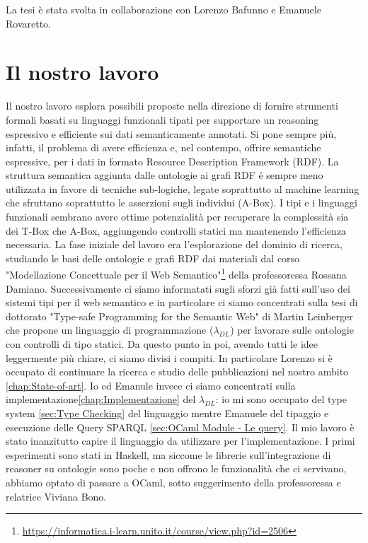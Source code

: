 La tesi è stata svolta in collaborazione con Lorenzo Bafunno e Emanuele Rovaretto.


\section{Il nostro lavoro}
    Il nostro lavoro esplora possibili proposte nella direzione di fornire strumenti formali basati su linguaggi funzionali tipati per supportare un reasoning
    espressivo e efficiente sui dati semanticamente annotati. Si pone sempre più, infatti, il problema di avere efficienza e, nel contempo, offrire semantiche 
    espressive, per i dati in formato Resource Description Framework (RDF). La struttura semantica aggiunta dalle ontologie ai grafi RDF \'e sempre meno utilizzata
    in favore di tecniche sub-logiche, legate soprattutto al machine learning che sfruttano soprattutto le asserzioni sugli individui (A-Box). 
    I tipi e i linguaggi funzionali sembrano avere ottime potenzialità per recuperare la complessità sia dei T-Box che A-Box, aggiungendo controlli statici
    ma mantenendo l'efficienza necessaria.
    La fase iniziale del lavoro era l'esplorazione del dominio di ricerca,
    studiando le basi delle ontologie e grafi RDF dai materiali dal corso "Modellazione Concettuale per il Web Semantico"\footnote{\url{https://informatica.i-learn.unito.it/course/view.php?id=2506}} 
    della professoressa Rossana Damiano.
    Successivamente ci siamo informatati sugli sforzi già fatti sull'uso dei sistemi tipi per il web semantico e in particolare ci siamo concentrati sulla tesi di
    dottorato "Type-safe Programming for the Semantic Web"\cite{leinbergerphdthesis} di Martin Leinberger che propone un linguaggio di programmazione ($\lambda_{DL}$) per lavorare sulle ontologie con 
    controlli di tipo statici. Da questo punto in poi, avendo tutti le idee leggermente più chiare, ci siamo divisi i compiti. In particolare Lorenzo si
    è occupato di continuare la ricerca e studio delle pubblicazioni nel nostro ambito \ref{chap:State-of-art}. Io ed Emanule invece ci siamo concentrati sulla implementazione\ref{chap:Implementazione}
    del $\lambda_{DL}$: io mi sono occupato del type system \ref{sec:Type Checking} del linguaggio mentre Emanuele del tipaggio e esecuzione delle Query SPARQL \ref{sec:OCaml Module - Le query}.
    Il mio lavoro è stato inanzitutto capire il linguaggio da utilizzare per l'implementazione. I primi esperimenti sono stati in Haskell, ma siccome le librerie
    sull'integrazione di reasoner su ontologie sono poche e non offrono le funzionalità che ci servivano, abbiamo optato di passare a OCaml, sotto suggerimento della professoressa e relatrice Viviana Bono. 
